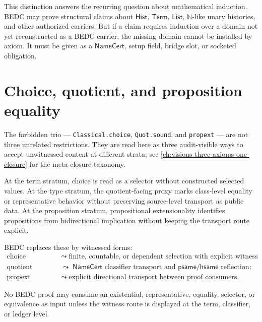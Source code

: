 This distinction answers the recurring question about mathematical induction. BEDC may prove structural claims about $\mathsf{Hist}$, $\mathsf{Term}$, $\mathsf{List}$, $\mathbb{N}$-like unary histories, and other authorized carriers. But if a claim requires induction over a domain not yet reconstructed as a BEDC carrier, the missing domain cannot be installed by axiom. It must be given as a $\mathsf{NameCert}$, setup field, bridge slot, or socketed obligation.

\section{Choice, quotient, and proposition equality}
\label{sec:external-supply-three-host-axioms}

The forbidden trio --- \texttt{Classical.choice}, \texttt{Quot.sound}, and \texttt{propext} --- are not three unrelated restrictions. They are read here as three audit-visible ways to accept unwitnessed content at different strata; see \autoref{ch:visions-three-axioms-one-closure} for the meta-closure taxonomy.

At the term stratum, choice is read as a selector without constructed selected values. At the type stratum, the quotient-facing proxy marks class-level equality or representative behavior without preserving source-level transport as public data. At the proposition stratum, propositional extensionality identifies propositions from bidirectional implication without keeping the transport route explicit.

BEDC replaces these by witnessed forms:
$$
\begin{aligned}
\text{choice} &\;\leadsto\; \text{finite, countable, or dependent selection with explicit witness functions;} \\
\text{quotient soundness} &\;\leadsto\; \mathsf{NameCert}\text{ classifier transport and }\mathsf{psame}/\mathsf{hsame}\text{ reflection;} \\
\text{propext} &\;\leadsto\; \text{explicit directional transport between proof consumers.}
\end{aligned}
$$

\begin{principle}
\label{prin:external-supply-no-unwitnessed-existential}
No BEDC proof may consume an existential, representative, equality, selector, or equivalence as input unless the witness route is displayed at the term, classifier, or ledger level.
\end{principle}

